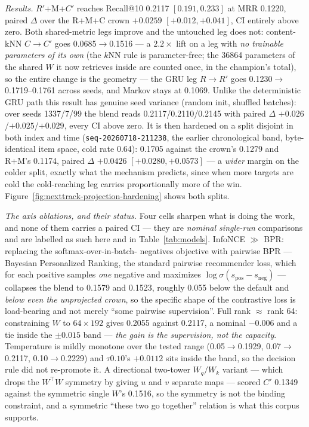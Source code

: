 \documentclass[11pt]{article}
\newcommand{\dsid}[1]{\texttt{\small #1}}
\newcommand{\Rp}{\ensuremath{R'}}
\newcommand{\Cp}{\ensuremath{C'}}
\begin{document}
\emph{Results.} \Rp+M+\Cp{} reaches Recall@10 \num{0.2117}
$[\num{0.191},\num{0.233}]$ at MRR \num{0.1220}, paired $\Delta$ over the R+M+C
crown $+\num{0.0259}$ $[+\num{0.012},+\num{0.041}]$, CI entirely above zero.
Both shared-metric legs improve and the untouched leg does not: content-kNN
$C\to\Cp$ goes \num{0.0685}$\to$\num{0.1516} --- a $2.2\times$ lift on a leg with
\emph{no trainable parameters of its own} (the $k$NN rule is parameter-free; the
\num{36864} parameters of the shared $W$ it now retrieves inside are counted once,
in the champion's total), so the entire change is the geometry ---
the GRU leg $R\to\Rp$ goes \num{0.1230}$\to$\numrange{0.1719}{0.1761} across
seeds, and Markov stays at \num{0.1069}. Unlike the deterministic GRU path this
result has genuine seed variance (random init, shuffled batches): over seeds
1337/7/99 the blend reads \num{0.2117}/\num{0.2110}/\num{0.2145} with paired
$\Delta$ $+\num{0.026}$/$+\num{0.025}$/$+\num{0.029}$, every CI above zero. It
is then hardened on a split disjoint in both index and time
(\dsid{seq-20260718-211238}, the earlier chronological band, byte-identical item
space, cold rate \num{0.64}): \num{0.1705} against the crown's \num{0.1279} and
R+M's \num{0.1174}, paired $\Delta$ $+\num{0.0426}$
$[+\num{0.0280},+\num{0.0573}]$ --- a \emph{wider} margin on the colder split,
exactly what the mechanism predicts, since when more targets are cold the
cold-reaching leg carries proportionally more of the win.
Figure~\ref{fig:nexttrack-projection-hardening} shows both splits.

\emph{The axis ablations, and their status.} Four cells sharpen what is doing
the work, and none of them carries a paired CI --- they are \emph{nominal
single-run} comparisons and are labelled as such here and in
Table~\ref{tab:models}. InfoNCE $\gg$ BPR: replacing the softmax-over-in-batch-
negatives objective with pairwise BPR --- Bayesian Personalized Ranking, the
standard pairwise recommender loss, which for each positive samples \emph{one}
negative and maximizes $\log\sigma(s_{\text{pos}}-s_{\text{neg}})$ --- collapses the
blend to \num{0.1579} and \num{0.1523}, roughly \num{0.055} below the default
and \emph{below even the unprojected crown}, so the specific shape of the
contrastive loss is load-bearing and not merely ``some pairwise supervision''.
Full rank $\approx$ rank 64: constraining $W$ to $64\times192$ gives
\num{0.2055} against \num{0.2117}, a nominal $-\num{0.006}$ and a tie inside the
$\pm\num{0.015}$ band --- \emph{the gain is the supervision, not the capacity}.
Temperature is mildly monotone over the tested range
(\num{0.05}$\to$\num{0.1929}, \num{0.07}$\to$\num{0.2117},
\num{0.10}$\to$\num{0.2229}) and $\tau0.10$'s $+\num{0.0112}$ sits inside the
band, so the decision rule did not re-promote it. A directional two-tower
$W_q/W_k$ variant --- which drops the $W^{\top}W$ symmetry by giving $u$ and $v$
separate maps --- scored \Cp{} \num{0.1349} against the symmetric single $W$'s
\num{0.1516}, so the symmetry is not the binding constraint, and a symmetric
``these two go together'' relation is what this corpus supports.
\end{document}
